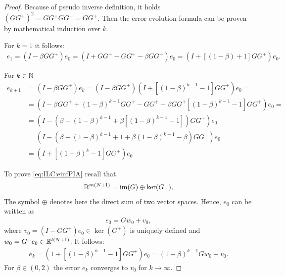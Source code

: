 \begin{proof}
	
	Because of pseudo inverse definition, it holds
	$(GG^+)^2 = GG^+GG^+ = GG^+$.  Then the error evolution formula can be proven by mathematical induction over $k$. 
	
	For $k = 1$ it follows: 
	\begin{align*}
	e_1 = (I - \beta G G^+)e_0 = (I + GG^+ - GG^+ - \beta G G^+)e_0 = (I + \left[(1 - \beta) + 1\right]GG^+)e_0.
	\end{align*}
	
	For $k \in {\mathbb{N}}$  
	\begin{align*}
	e_{k+1} &= ( I - \beta G G^+)e_k = ( I - \beta G G^+) (I+  \left[(1-\beta)^{k-1} - 1\right] G G^+) e_0 = \\
	& = \left(I - \beta G G^+ + (1-\beta)^{k-1}GG^+ - GG^+ - \beta GG^+\left[(1 - \beta)^{k-1} - 1\right]GG^+\right)e_0=\\
	& = \left(I - (\beta - (1-\beta)^{k-1} + \beta\left[(1 - \beta)^{k-1} - 1\right])G G^+\right)e_0\\
	& = \left(I - \left(\beta - (1-\beta)^{k-1} + 1 + \beta(1-\beta)^{k-1} - \beta\right)GG^+\right)e_0\\
	& = (I+  \left[(1-\beta)^k - 1\right] G G^+) e_0
	\end{align*}
	         
	To prove \eqref{eq:ILC:einfPIA}  recall that 
	\begin{align*}
	{\mathbb{R}}^{m(N+1)} = \operatorname{im}(G)\oplus \ker (G^+),
	\end{align*}
	The symbol $\oplus$ denotes here the direct sum of two vector spaces. %
	Hence, $e_0$ can be written as 
	\begin{align*}  
	e_0 = G w_0 + v_0,
	\end{align*}
	where $v_0 = (I - G G^+)e_0 \in \ker (G^+)$  is uniquely defined and $w_0 = G^+ e_0 \in {\mathbb{R}}^{l(N+1)}$. It follows: 
	\begin{align*}
	e_{k} = (1+ \left[(1 - \beta)^{k-1} - 1\right]GG^+)e_0 = (1-\beta)^{k-1} G w_0 + v_0.
	\end{align*}
	For $\beta \in (0,2)$ the error $e_k$ converges to $v_0$ for $k \to \infty$. %
\end{proof}

